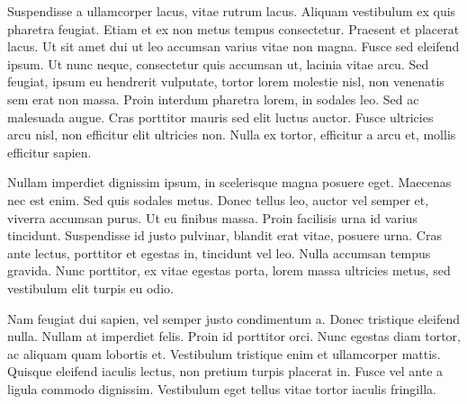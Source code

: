 Suspendisse a ullamcorper lacus, vitae rutrum lacus. Aliquam vestibulum ex quis pharetra feugiat. Etiam et ex non metus tempus consectetur. Praesent et placerat lacus. Ut sit amet dui ut leo accumsan varius vitae non magna. Fusce sed eleifend ipsum. Ut nunc neque, consectetur quis accumsan ut, lacinia vitae arcu. Sed feugiat, ipsum eu hendrerit vulputate, tortor lorem molestie nisl, non venenatis sem erat non massa. Proin interdum pharetra lorem, in sodales leo. Sed ac malesuada augue. Cras porttitor mauris sed elit luctus auctor. Fusce ultricies arcu nisl, non efficitur elit ultricies non. Nulla ex tortor, efficitur a arcu et, mollis efficitur sapien.

Nullam imperdiet dignissim ipsum, in scelerisque magna posuere eget. Maecenas nec est enim. Sed quis sodales metus. Donec tellus leo, auctor vel semper et, viverra accumsan purus. Ut eu finibus massa. Proin facilisis urna id varius tincidunt. Suspendisse id justo pulvinar, blandit erat vitae, posuere urna. Cras ante lectus, porttitor et egestas in, tincidunt vel leo. Nulla accumsan tempus gravida. Nunc porttitor, ex vitae egestas porta, lorem massa ultricies metus, sed vestibulum elit turpis eu odio.

Nam feugiat dui sapien, vel semper justo condimentum a. Donec tristique eleifend nulla. Nullam at imperdiet felis. Proin id porttitor orci. Nunc egestas diam tortor, ac aliquam quam lobortis et. Vestibulum tristique enim et ullamcorper mattis. Quisque eleifend iaculis lectus, non pretium turpis placerat in. Fusce vel ante a ligula commodo dignissim. Vestibulum eget tellus vitae tortor iaculis fringilla.